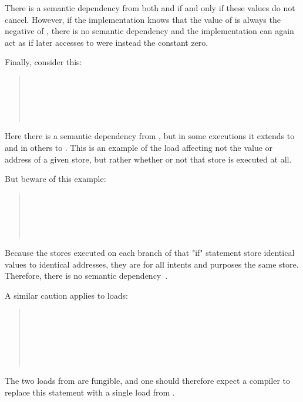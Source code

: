 \documentclass[10]{article}
\begin{document}
There is a semantic dependency from both  and  if and only
if these values do not cancel.
However, if the implementation knows that the value of  is always
the negative of , there is no semantic dependency and the
implementation can again act as if later accesses to  were
instead the constant zero.

Finally, consider this:

\begin{quote}
	 \\
	 \\
	 \\
	 \\
\end{quote}

Here there is a semantic dependency from , but in some executions
it extends to  and in others to .
This is an example of the load affecting not the value or address of
a given store, but rather whether or not that store is executed at all.

But beware of this example:

\begin{quote}
	 \\
	 \\
	 \\
	 \\
\end{quote}

Because the stores executed on each branch of that "if" statement
store identical values to identical addresses, they are for all intents
and purposes the same store.
Therefore, there is no semantic dependency~\cite{Howells2009membartxt}.

A similar caution applies to loads:

\begin{quote}
	 \\
	 \\
	 \\
	 \\
	 \\
\end{quote}

The two loads from  are fungible, and one should therefore expect
a compiler to replace this  statement with a single load from .
\end{document}
